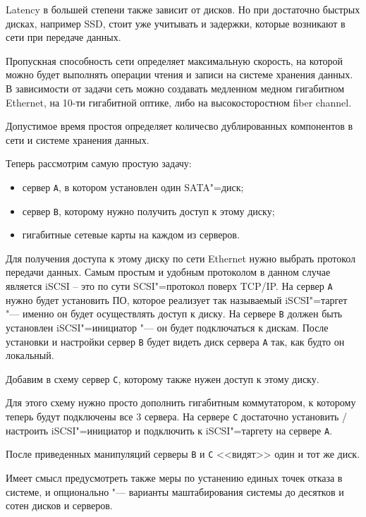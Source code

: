 \documentclass[10pt, a5paper]{article}
\begin{document}
Latency в большей степени также зависит от дисков. Но при достаточно быстрых дисках, например SSD, стоит уже учитывать и задержки, которые возникают в сети при передаче данных.

Пропускная способность сети определяет максимальную скорость, на которой можно будет выполнять операции чтения и записи на системе хранения данных. В зависимости от задачи сеть можно создавать медленном медном гигабитном Ethernet, на 10-ти гигабитной оптике, либо на высокосторостном fiber channel.

Допустимое время простоя определяет количесво дублированных компонентов в сети и системе хранения данных.

Теперь рассмотрим самую простую задачу:

\begin{itemize}
  \item сервер \verb!A!, в котором установлен один SATA"=диск;
  \item сервер \verb!B!, которому нужно получить доступ к этому диску;
  \item гигабитные сетевые карты на каждом из серверов.
\end{itemize}

Для получения доступа к этому диску по сети Ethernet нужно выбрать протокол передачи данных. Самым простым и удобным протоколом в данном случае является iSCSI -- это по сути SCSI"=протокол поверх TCP/IP. На сервер \verb!A! нужно будет установить ПО, которое реализует так называемый iSCSI"=таргет "--- именно он будет осуществлять доступ к диску. На сервере \verb!B! должен быть установлен iSCSI"=инициатор "--- он будет подключаться к дискам. После установки и настройки сервер \verb!B! будет видеть диск сервера \verb!A! так, как будто он локальный.

Добавим в схему сервер \verb!C!, которому также нужен доступ к этому диску.

Для этого схему нужно просто дополнить гигабитным коммутатором, к которому теперь будут подключены все 3 сервера. На сервере \verb!C! достаточно установить / настроить iSCSI"=инициатор и подключить к iSCSI"=таргету на сервере \verb!A!.

После приведенных манипуляций серверы \verb!B! и \verb!C! <<видят>> один и тот же диск.

Имеет смысл предусмотреть также меры по устанению единых точек отказа в системе, и опционально "--- варианты маштабирования системы до десятков и сотен дисков и серверов.
\end{document}
